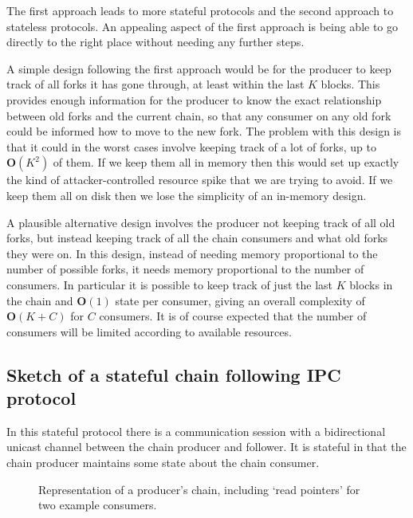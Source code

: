 \documentclass{article}
\theoremstyle{definition}{
  \newtheorem{lemma}{Lemma}[section] %
  \newtheorem{definition}[lemma]{Definition}
}
\theoremstyle{theorem}{
  \newtheorem{invariant}[lemma]{Invariant}
  \newtheorem{proofobligation}[lemma]{Proof Obligation}
}
\numberwithin{equation}{lemma}
\begin{document}
The first approach leads to more stateful protocols and the second approach to
stateless protocols. An appealing aspect of the first approach is being able to
go directly to the right place without needing any further steps.

A simple design following the first approach would be for the producer to keep
track of all forks it has gone through, at least within the last $K$ blocks.
This provides enough information for the producer to know the exact relationship
between old forks and the current chain, so that any consumer on any old fork
could be informed how to move to the new fork. The problem with this design is
that it could in the worst cases involve keeping track of a lot of forks, up to
$\mathbf{O}(K^2)$ of them. If we keep them all in memory then this would set up
exactly the kind of attacker-controlled resource spike that we are trying to
avoid. If we keep them all on disk then we lose the simplicity of an in-memory
design.

A plausible alternative design involves the producer not keeping track of all
old forks, but instead keeping track of all the chain consumers and what old
forks they were on. In this design, instead of needing memory proportional to
the number of possible forks, it needs memory proportional to the number of
consumers. In particular it is possible to keep track of just the last $K$
blocks in the chain and $\mathbf{O}(1)$ state per consumer, giving an overall
complexity of $\mathbf{O}(K + C)$ for $C$ consumers. It is of course expected
that the number of consumers will be limited according to available resources.

\subsection{Sketch of a stateful chain following IPC protocol}

In this stateful protocol there is a communication session with a bidirectional
unicast channel between the chain producer and follower. It is stateful in that
the chain producer maintains some state about the chain consumer.

\begin{figure}
\begin{center}
\end{center}
\caption{Representation of a producer's chain, including `read pointers' for two example consumers.}
\label{chain-diagram-read-pointers}
\end{figure}
\end{document}
